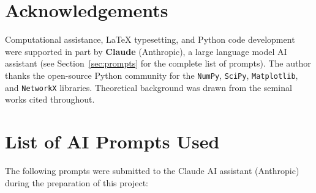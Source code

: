 \documentclass[12pt,a4paper]{article}
\begin{document}
\section*{Acknowledgements}
\label{sec:ack}

Computational assistance, LaTeX typesetting, and Python code
development were supported in part by \textbf{Claude} (Anthropic),
a large language model AI assistant (see Section~\ref{sec:prompts}
for the complete list of prompts).  The author thanks the open-source
Python community for the \texttt{NumPy}, \texttt{SciPy},
\texttt{Matplotlib}, and \texttt{NetworkX} libraries.  Theoretical
background was drawn from the seminal works cited throughout.

\section*{List of AI Prompts Used}
\label{sec:prompts}

The following prompts were submitted to the Claude AI assistant
(Anthropic) during the preparation of this project:
\end{document}
